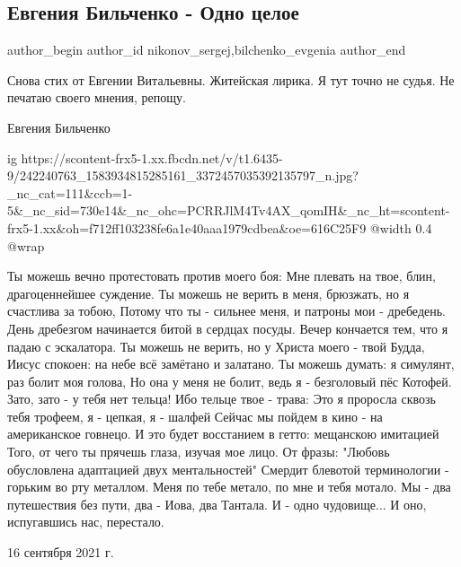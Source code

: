  
 
 
 
 
 
\subsection{Евгения Бильченко - Одно целое}
\label{sec:18_09_2021.fb.nikonov_sergej.7.bilchenko_odno_celoje}
 
\ifcmt
 author_begin
   author_id nikonov_sergej,bilchenko_evgenia
 author_end
\fi

Снова стих от Евгении Витальевны. Житейская лирика. Я тут точно не судья. Не печатаю своего мнения, репощу. 

Евгения Бильченко


\ifcmt
  ig https://scontent-frx5-1.xx.fbcdn.net/v/t1.6435-9/242240763_1583934815285161_3372457035392135797_n.jpg?_nc_cat=111&ccb=1-5&_nc_sid=730e14&_nc_ohc=PCRRJlM4Tv4AX_qomIH&_nc_ht=scontent-frx5-1.xx&oh=f712ff103238fe6a1e40aaa1979cdbea&oe=616C25F9
  @width 0.4
  @wrap 
\fi

\obeycr
Ты можешь вечно протестовать против моего боя:
Мне плевать на твое, блин, драгоценнейшее суждение.
Ты можешь не верить в меня, брюзжать, но я счастлива за тобою,
Потому что ты - сильнее меня, и патроны мои - дребедень.
День дребезгом начинается битой в сердцах посуды.
Вечер кончается тем, что я падаю с эскалатора.
Ты можешь не верить, но у Христа моего - твой Будда,
Иисус спокоен: на небе всё замётано и залатано.
Ты можешь думать: я симулянт, раз болит моя голова,
Но она у меня не болит, ведь я - безголовый пёс Котофей.
Зато, зато - у тебя нет тельца! Ибо тельце твое - трава:
Это я проросла сквозь тебя трофеем, я - цепкая, я - шалфей
Сейчас мы пойдем в кино - на американское говнецо.
И это будет восстанием в гетто: мещанскою имитацией
Того, от чего ты прячешь глаза, изучая мое лицо.
От фразы: "Любовь обусловлена адаптацией двух ментальностей" \textendash
Смердит блевотой терминологии - горьким во рту металлом.
Меня по тебе метало, по мне и тебя мотало.
Мы - два путешествия без пути, два - Иова, два Тантала.
И - одно чудовище...
И оно, испугавшись нас, перестало.
\restorecr

16 сентября 2021 г.
